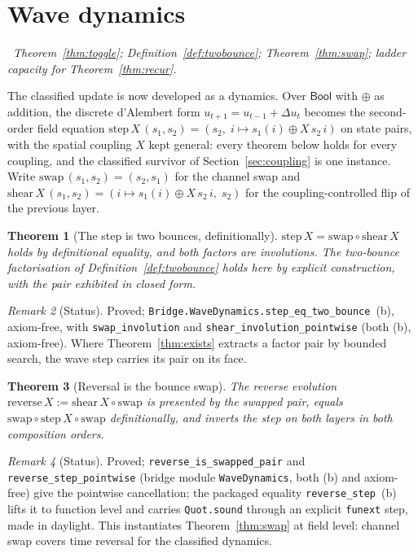 \documentclass[11pt,a4paper]{article}
\theoremstyle{plain}
\newtheorem{theorem}{Theorem}[section]
\theoremstyle{definition}
\theoremstyle{remark}
\newtheorem{remark}[theorem]{Remark}
\newcommand{\Bool}{\mathsf{Bool}}
\newcommand{\comp}{\circ}
\newcommand{\dep}[1]{%
  \par\noindent{\small\color{muted}\sffamily Dependence:}~\textit{#1}\par\medskip}
\begin{document}
\section{Wave dynamics}
\label{sec:wave}

\dep{Theorem~\ref{thm:toggle}; Definition~\ref{def:twobounce};
Theorem~\ref{thm:swap}; ladder capacity for
Theorem~\ref{thm:recur}.}

The classified update is now developed as a dynamics. Over $\Bool$
with $\oplus$ as addition, the discrete d'Alembert form
$u_{t+1}=u_{t-1}+\Delta u_t$ becomes the second-order field equation
$\mathrm{step}\,X\,(s_1,s_2) = (s_2,\; i\mapsto s_1(i)\oplus X\,s_2\,i)$
on state pairs, with the spatial coupling $X$ kept general: every
theorem below holds for every coupling, and the classified survivor of
Section~\ref{sec:coupling} is one instance. Write
$\mathrm{swap}\,(s_1,s_2)=(s_2,s_1)$ for the channel swap and
$\mathrm{shear}\,X\,(s_1,s_2)=(i\mapsto s_1(i)\oplus X\,s_2\,i,\;s_2)$
for the coupling-controlled flip of the previous layer.

\begin{theorem}[The step is two bounces, definitionally]
\label{thm:wavebounce}
$\mathrm{step}\,X = \mathrm{swap}\comp\mathrm{shear}\,X$ holds by
definitional equality, and both factors are involutions. The
two-bounce factorisation of Definition~\ref{def:twobounce} holds here
by explicit construction, with the pair exhibited in closed form.
\end{theorem}

\begin{remark}[Status]
Proved; \texttt{Bridge.WaveDynamics.step\_eq\_two\_bounce}~(b),
axiom-free, with \texttt{swap\_involution} and
\texttt{shear\_involution\_pointwise} (both (b), axiom-free). Where
Theorem~\ref{thm:exists} extracts a factor pair by bounded search,
the wave step carries its pair on its face.
\end{remark}

\begin{theorem}[Reversal is the bounce swap]
\label{thm:wavereverse}
The reverse evolution $\mathrm{reverse}\,X :=
\mathrm{shear}\,X\comp\mathrm{swap}$ is presented by the swapped pair,
equals $\mathrm{swap}\comp\mathrm{step}\,X\comp\mathrm{swap}$
definitionally, and inverts the step on both layers in both
composition orders.
\end{theorem}

\begin{remark}[Status]
Proved; \texttt{reverse\_is\_swapped\_pair} and
\texttt{reverse\_step\_pointwise} (bridge module
\texttt{WaveDynamics}, both (b) and axiom-free) give the
pointwise cancellation; the packaged equality
\texttt{reverse\_step}~(b) lifts it to function level and carries
\texttt{Quot.sound} through an explicit \texttt{funext} step, made in
daylight. This instantiates Theorem~\ref{thm:swap} at field level:
channel swap covers time reversal for the classified dynamics.
\end{remark}
\end{document}
